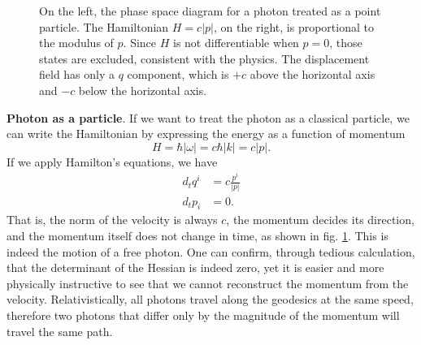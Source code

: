 \begin{figure}
	\centering
	\caption {On the left, the phase space diagram for a photon treated as a point particle. The Hamiltonian $H=c|p|$, on the right, is proportional to the modulus of $p$. Since $H$ is not differentiable when $p=0$, those states are excluded, consistent with the physics. The displacement field has only a $q$ component, which is $+c$ above the horizontal axis and $-c$ below the horizontal axis. } \label{fig_rp_cm_photon}
\end{figure}

\textbf{Photon as a particle}. If we want to treat the photon as a classical particle, we can write the Hamiltonian by expressing the energy as a function of momentum
\begin{equation}
	H=\hbar | \omega| = c \hbar |k| = c |p|.
\end{equation}
If we apply Hamilton's equations, we have
\begin{equation}
	\begin{aligned}
		d_t q^i &= c \frac{p^i}{|p|} \\
		d_t p_i &= 0.
	\end{aligned}
\end{equation}
That is, the norm of the velocity is always $c$, the momentum decides its direction, and the momentum itself does not change in time, as shown in fig. \ref{fig_rp_cm_photon}. This is indeed the motion of a free photon. One can confirm, through tedious calculation, that the determinant of the Hessian is indeed zero, yet it is easier and more physically instructive to see that we cannot reconstruct the momentum from the velocity. Relativistically, all photons travel along the geodesics at the same speed, therefore two photons that differ only by the magnitude of the momentum will travel the same path.

